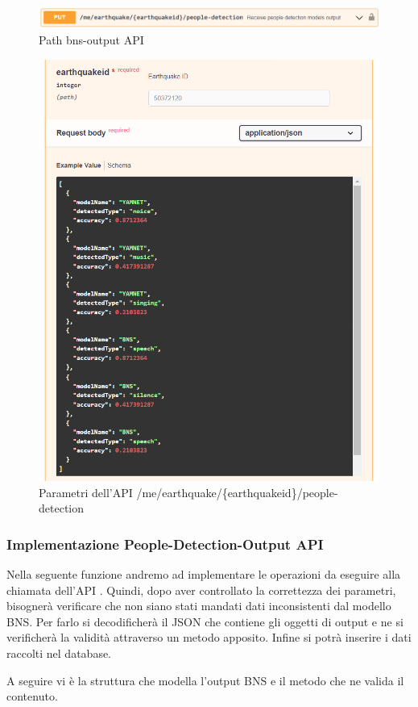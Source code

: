 \documentclass[main.tex]{subfiles}
\begin{document}
\begin{figure}[H]
    \centering
    \includegraphics[width=1\linewidth]{img/Post-Earthquake/bns-output-API-path.PNG}
    \caption{Path bns-output API}
    \label{fig:bns-output-path}
\end{figure}
\begin{figure}[H]
    \centering
    \includegraphics[scale=0.75]{img/Post-Earthquake/bns-output-API-example.PNG}
    \caption{Parametri dell'API /me/earthquake/\{earthquakeid\}/people-detection}
    \label{fig:bns-output-example}
\end{figure}
\newpage
\subsubsection{Implementazione People-Detection-Output API}
Nella seguente funzione andremo ad implementare le operazioni da eseguire alla chiamata dell'API . Quindi, dopo aver controllato la correttezza dei parametri, bisognerà verificare che non siano stati mandati dati inconsistenti dal modello BNS. Per farlo si decodificherà il JSON che contiene gli oggetti di output e ne si verificherà la validità attraverso un metodo apposito. Infine si potrà inserire i dati raccolti nel database.

A seguire vi è la struttura che modella l'output BNS e il metodo che ne valida il contenuto.

\end{document}
